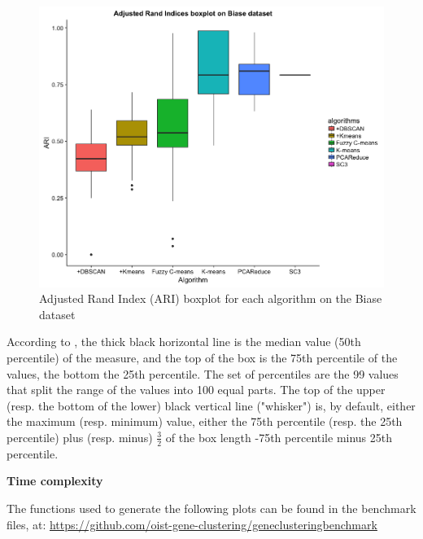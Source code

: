 \documentclass{report}
\begin{document}
{\begin{figure}[H]
\centering
\includegraphics[scale=0.4]{benchmark/boxplotStability.png}
\caption{Adjusted Rand Index (ARI) boxplot for each algorithm on the Biase dataset}
\label{allBoxplotARI}
\end{figure}

According to \cite{boxplot}, the thick black horizontal line is the median value (50th percentile) of the measure, and the top of the box is the 75th percentile of the values, the bottom the 25th percentile. The set of percentiles are the 99 values that split the range of the values into 100 equal parts. The top of the upper (resp. the bottom of the lower) black vertical line ("whisker") is, by default, either the maximum (resp. minimum) value, either the 75th percentile (resp. the 25th percentile) plus (resp. minus) $\frac{3}{2}$ of the box length -75th percentile minus 25th percentile.


\bigskip
\noindent \textbf{Time complexity}
\bigskip

The functions used to generate the following plots can be found in the benchmark files, at: {\url{https://github.com/oist-gene-clustering/geneclusteringbenchmark}}\\

}
\end{document}
